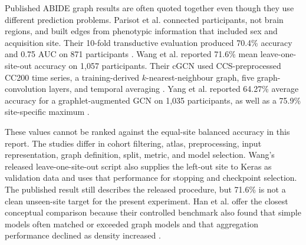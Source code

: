 \documentclass[11pt,a4paper]{article}
\begin{document}
Published ABIDE graph results are often quoted together even though they use
different prediction problems. Parisot et al. connected participants, not
brain regions, and built edges from phenotypic information that included sex
and acquisition site. Their 10-fold transductive evaluation produced 70.4\%
accuracy and 0.75 AUC on 871 participants \cite{parisot2018disease}. Wang et
al. reported 71.6\% mean leave-one-site-out accuracy on 1,057 participants.
Their cGCN used CCS-preprocessed CC200 time series, a training-derived
$k$-nearest-neighbour graph, five graph-convolution layers, and temporal
averaging \cite{wang2021cgcn}. Yang et al. reported 64.27\% average accuracy
for a graphlet-augmented GCN on 1,035 participants, as well as a 75.9\%
site-specific maximum \cite{yang2022graphletgcn}.

These values cannot be ranked against the equal-site balanced accuracy in this
report. The studies differ in cohort filtering, atlas, preprocessing, input
representation, graph definition, split, metric, and model selection. Wang's
released leave-one-site-out script also supplies the left-out site to Keras as
validation data and uses that performance for stopping and checkpoint
selection. The published result still describes the released procedure, but
71.6\% is not a clean unseen-site target for the present experiment. Han et
al. offer the closest conceptual comparison because their controlled benchmark
also found that simple models often matched or exceeded graph models and that
aggregation performance declined as density increased
\cite{han2026rethinking}.
\end{document}
